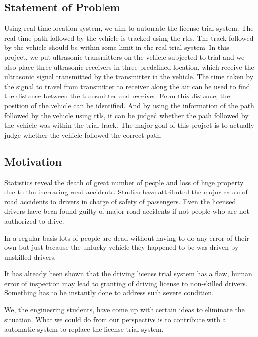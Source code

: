 \subsection{Statement of Problem}
Using real time location system, we aim to automate the license trial system. The real time path followed by the vehicle is tracked using the \gls{rtls}. The track followed by the vehicle should be within some limit in the real trial system. In this project, we put ultrasonic transmitters on the vehicle subjected to trial and we also place three ultrasonic receivers in three predefined location, which receive the ultrasonic signal transmitted by the transmitter in the vehicle. The time taken by the signal to travel from transmitter to receiver along the air can be used to find the distance between the transmitter and receiver. From this distance, the position of the vehicle can be identified. And by using the information of the path followed by the vehicle using \gls{rtls}, it can be judged whether the path followed by the vehicle was within the trial track. The major goal of this project is to actually judge whether the vehicle followed the correct path. 


\subsection{Motivation}
Statistics reveal the death of great number of people and loss of huge property due to the increasing road accidents. Studies have attributed the major cause of road accidents to drivers in charge of safety of passengers. Even the licensed drivers have been found guilty of major road accidents if not people who are not authorized to drive. 


In a regular basis lots of people are dead without having to do any error of their own but just because the unlucky vehicle they happened to be was driven by unskilled drivers.


It has already been shown that the driving license trial system has a flaw, human error of inspection may lead to granting of driving license to non-skilled drivers. Something has to be instantly done to address such severe condition. 


We, the engineering students, have come up with certain ideas to eliminate the situation. What we could do from our perspective is to contribute with a automatic system to replace the license trial system. 
